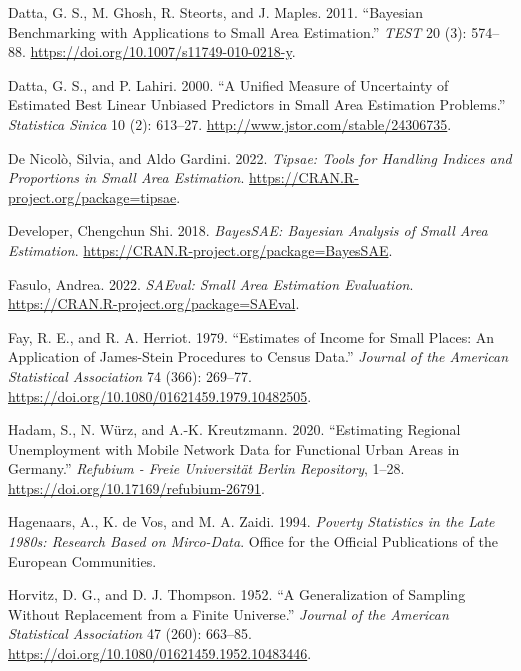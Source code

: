 \begin{CSLReferences}{1}{0}
\leavevmode{}%
Datta, G. S., M. Ghosh, R. Steorts, and J. Maples. 2011. {``Bayesian Benchmarking with Applications to Small Area Estimation.''} \emph{TEST} 20 (3): 574--88. \url{https://doi.org/10.1007/s11749-010-0218-y}.

\leavevmode{}%
Datta, G. S., and P. Lahiri. 2000. {``A Unified Measure of Uncertainty of Estimated Best Linear Unbiased Predictors in Small Area Estimation Problems.''} \emph{Statistica Sinica} 10 (2): 613--27. \url{http://www.jstor.com/stable/24306735}.

\leavevmode{}%
De Nicolò, Silvia, and Aldo Gardini. 2022. \emph{Tipsae: Tools for Handling Indices and Proportions in Small Area Estimation}. \url{https://CRAN.R-project.org/package=tipsae}.

\leavevmode{}%
Developer, Chengchun Shi. 2018. \emph{BayesSAE: Bayesian Analysis of Small Area Estimation}. \url{https://CRAN.R-project.org/package=BayesSAE}.

\leavevmode{}%
Fasulo, Andrea. 2022. \emph{{SAEval}: Small Area Estimation Evaluation}. \url{https://CRAN.R-project.org/package=SAEval}.

\leavevmode{}%
Fay, R. E., and R. A. Herriot. 1979. {``Estimates of Income for Small Places: An Application of {James-Stein} Procedures to Census Data.''} \emph{Journal of the American Statistical Association} 74 (366): 269--77. \url{https://doi.org/10.1080/01621459.1979.10482505}.

\leavevmode{}%
Hadam, S., N. Würz, and A.-K. Kreutzmann. 2020. {``Estimating Regional Unemployment with Mobile Network Data for Functional Urban Areas in {Germany}.''} \emph{{Refubium - Freie Universität Berlin Repository}}, 1--28. \url{https://doi.org/10.17169/refubium-26791}.

\leavevmode{}%
Hagenaars, A., K. de Vos, and M. A. Zaidi. 1994. \emph{Poverty Statistics in the Late 1980s: Research Based on Mirco-Data}. Office for the Official Publications of the European Communities.

\leavevmode{}%
Horvitz, D. G., and D. J. Thompson. 1952. {``A Generalization of Sampling Without Replacement from a Finite Universe.''} \emph{Journal of the American Statistical Association} 47 (260): 663--85. \url{https://doi.org/10.1080/01621459.1952.10483446}.


\end{CSLReferences}
